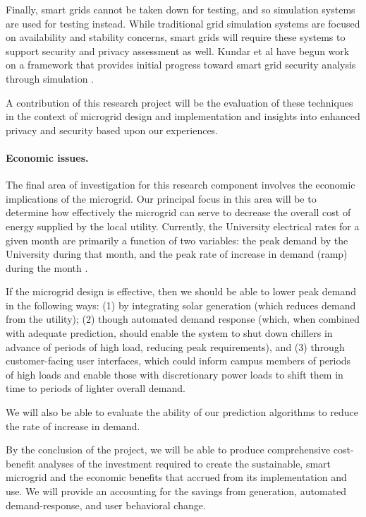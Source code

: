Finally, smart grids cannot be taken down for testing, and so simulation
systems are used for testing instead.  While traditional grid simulation
systems are focused on availability and stability concerns, smart grids
will require these systems to support security and privacy assessment as
well. Kundar et al have begun work on a framework that provides initial
progress toward smart grid security analysis through simulation
\cite{Kundur2010}.

A contribution of this research project will be the evaluation of these
techniques in the context of microgrid design and implementation and
insights into enhanced privacy and security based upon our experiences.

\paragraph{Economic issues.}

The final area of investigation for this research component involves the economic
implications of the microgrid.  Our principal focus in this area will be to
determine how effectively the microgrid can serve to decrease the overall
cost of energy supplied by the local utility.  Currently, the University
electrical rates for a given month are primarily a function of two
variables: the peak demand by the University during that month, and the
peak rate of increase in demand (ramp) during the month \cite{Hafner2011}.

If the microgrid design is effective, then we should be able to lower peak
demand in the following ways: (1) by integrating solar generation (which
reduces demand from the utility); (2) though automated demand response
(which, when combined with adequate prediction, should enable the system to
shut down chillers in advance of periods of high load, reducing peak
requirements), and (3) through customer-facing user interfaces, which could
inform campus members of periods of high loads and enable those with
discretionary power loads to shift them in time to periods of lighter
overall demand.

We will also be able to evaluate the ability of our prediction algorithms
to reduce the rate of increase in demand. 

By the conclusion of the project, we will be able to produce comprehensive
cost-benefit analyses of the investment required to create the sustainable,
smart microgrid and the economic benefits that accrued from its
implementation and use.  We will provide an accounting for the savings from
generation, automated demand-response, and user behavioral change.




  


